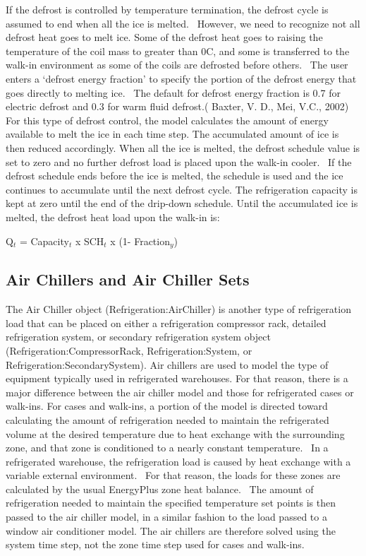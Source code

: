 If the defrost is controlled by temperature termination, the defrost cycle is assumed to end when all the ice is melted.~ However, we need to recognize not all defrost heat goes to melt ice. Some of the defrost heat goes to raising the temperature of the coil mass to greater than 0C, and some is transferred to the walk-in environment as some of the coils are defrosted before others.~ The user enters a `defrost energy fraction' to specify the portion of the defrost energy that goes directly to melting ice.~ The default for defrost energy fraction is 0.7 for electric defrost and 0.3 for warm fluid defrost.( Baxter, V. D., Mei, V.C., 2002) For this type of defrost control, the model calculates the amount of energy available to melt the ice in each time step. The accumulated amount of ice is then reduced accordingly. When all the ice is melted, the defrost schedule value is set to zero and no further defrost load is placed upon the walk-in cooler.~ If the defrost schedule ends before the ice is melted, the schedule is used and the ice continues to accumulate until the next defrost cycle. The refrigeration capacity is kept at zero until the end of the drip-down schedule. Until the accumulated ice is melted, the defrost heat load upon the walk-in is:

Q\(_{t}\) = Capacity\(_{t}\) x SCH\(_{t}\) x (1- Fraction\(_{y}\))

\subsection{Air Chillers and Air Chiller Sets}\label{air-chillers-and-air-chiller-sets}

The Air Chiller object (Refrigeration:AirChiller) is another type of refrigeration load that can be placed on either a refrigeration compressor rack, detailed refrigeration system, or secondary refrigeration system object (Refrigeration:CompressorRack, Refrigeration:System, or Refrigeration:SecondarySystem). Air chillers are used to model the type of equipment typically used in refrigerated warehouses. For that reason, there is a major difference between the air chiller model and those for refrigerated cases or walk-ins. For cases and walk-ins, a portion of the model is directed toward calculating the amount of refrigeration needed to maintain the refrigerated volume at the desired temperature due to heat exchange with the surrounding zone, and that zone is conditioned to a nearly constant temperature.~ In a refrigerated warehouse, the refrigeration load is caused by heat exchange with a variable external environment.~ For that reason, the loads for these zones are calculated by the usual EnergyPlus zone heat balance.~ The amount of refrigeration needed to maintain the specified temperature set points is then passed to the air chiller model, in a similar fashion to the load passed to a window air conditioner model. The air chillers are therefore solved using the system time step, not the zone time step used for cases and walk-ins.

